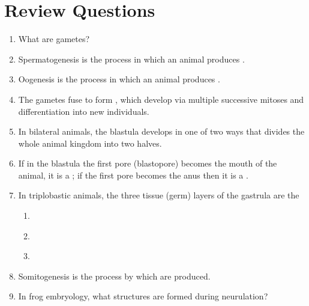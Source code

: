 \section{Review Questions}\label{review-questions-10}

\begin{enumerate}
\def\labelenumi{\arabic{enumi}.}
\item
  What are gametes?
\item
  Spermatogenesis is the process in which an animal produces
  \underline{\phantom{answer}}.
\item
  Oogenesis is the process in which an animal produces
  \underline{\phantom{answer}}.
\item
  The gametes fuse to form \underline{\phantom{answer}}, which develop
  via multiple successive mitoses and differentiation into new
  individuals.
\item
  In bilateral animals, the blastula develops in one of two ways that
  divides the whole animal kingdom into two halves.
\item
  If in the blastula the first pore (blastopore) becomes the mouth of
  the animal, it is a \underline{\phantom{answer}}; if the first pore
  becomes the anus then it is a \underline{\phantom{answer}}.
\item
  In triplobastic animals, the three tissue (germ) layers of the
  gastrula are the
\begin{enumerate}
\def\labelenumi{\arabic{enumi}.}
\item
\underline{\phantom{answer}}
\item
\underline{\phantom{answer}}
\item
\underline{\phantom{answer}}
\end{enumerate}
\item
  Somitogenesis is the process by which \underline{\phantom{answer}}
  are produced.
\item
  In frog embryology, what structures are formed during neurulation?
\end{enumerate}
